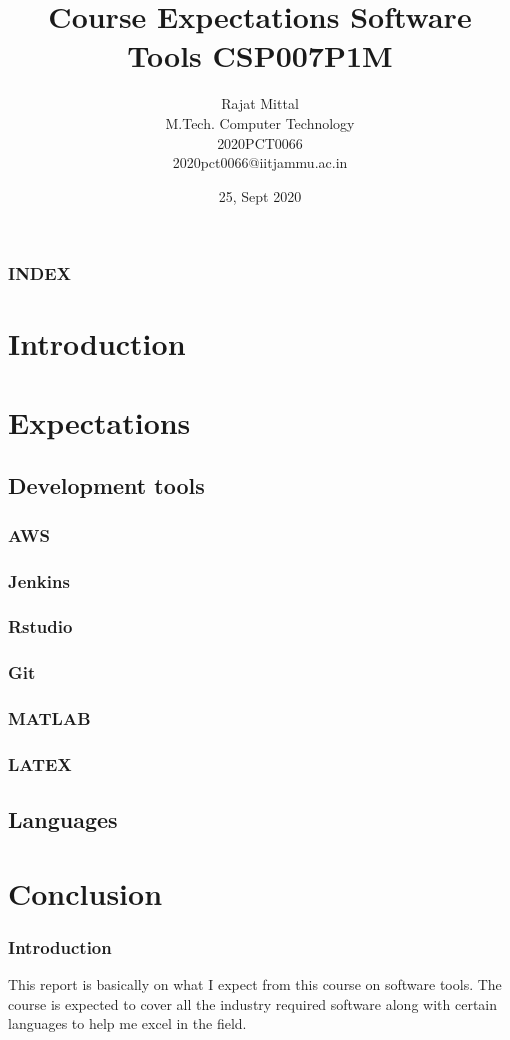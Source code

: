 \documentclass{beamer}
\title[Course Expectations] %
{Course Expectations Software Tools CSP007P1M}
\author[Rajat Mittal] %
{Rajat Mittal\\
M.Tech. Computer Technology \\
2020PCT0066\\
2020pct0066@iitjammu.ac.in}
\institute[IIT JAMMU] %
{
  \inst{}%
  Indian Institute of Technology Jammu \\
Jagti, NH-44 , PO Nagrota \\
Jammu - 181 221 J&K,  India \\
}
\date
{25, Sept 2020}
\begin{document}
\frame{\titlepage}


\begin{frame}
\frametitle{INDEX}
\tableofcontents
\end{frame}


\section{Introduction}
\section{Expectations}
\subsection{Development tools}
\subsubsection{AWS}
\subsubsection{Jenkins}
\subsubsection{Rstudio}
\subsubsection{Git}
\subsubsection{MATLAB}
\subsubsection{LATEX}
\subsection{Languages}
\section{Conclusion}
\begin{frame}
\frametitle{Introduction}
This report is basically on what I expect from this course on software tools. The course is expected to cover all the industry required software along with certain languages to help me excel in the field.

\end{frame}
\end{document}
